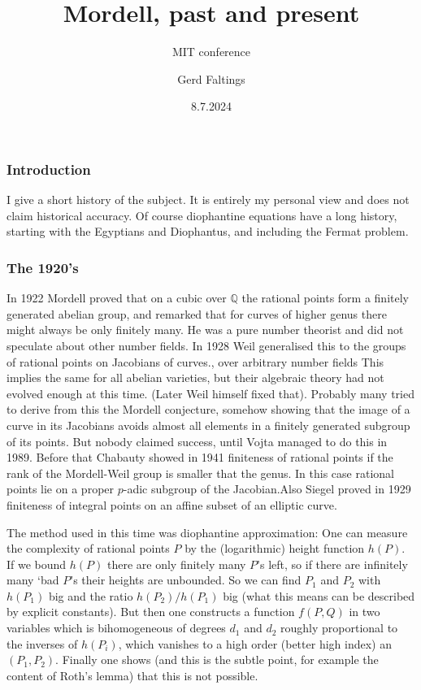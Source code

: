 \documentclass{beamer}
\title{Mordell, past and present}
\subtitle{MIT conference}
\author[G. Faltings]{Gerd Faltings}
\institute[MPIM]{Max Planck Institute for Mathematics}
\date{8.7.2024}
\begin{document}
\begin{frame}
  \titlepage
\end{frame}

\begin{frame}
\frametitle{Introduction}
I give a short history of the subject. It is entirely my personal view and does not claim historical accuracy. Of course diophantine equations have a long history,  starting with the Egyptians and Diophantus, and including the Fermat problem.
\end{frame}
\begin{frame}
\frametitle{The 1920's}
In 1922 Mordell proved that on a cubic over $\mathbb{Q}$ the rational points form a finitely generated abelian group, and remarked that for curves of higher genus there might always be only finitely many. He was a pure number theorist and did not speculate about other number fields.  In 1928 Weil generalised this to the groups of rational points on Jacobians of curves., over arbitrary number fields This implies the same for all abelian varieties, but their algebraic theory had not evolved enough at this time. (Later Weil himself fixed that). Probably many tried to derive from this the Mordell conjecture, somehow showing that the image of a curve in its Jacobians avoids almost all elements in a finitely generated subgroup of its points. But nobody claimed success, until Vojta managed to do this in 1989. Before that Chabauty showed in 1941 finiteness of rational points if the rank of the Mordell-Weil group is smaller that the genus. In this case rational points lie on a proper $p$-adic subgroup of the Jacobian.Also Siegel proved in 1929 finiteness of integral points on an affine subset of an elliptic curve. 
\end{frame}
\begin{frame}
The method used in this time was diophantine approximation: One can measure the complexity of rational points  $P$ by the (logarithmic) height function $h(P)$. If we bound $h(P)$ there are only finitely many $P$'s left, so if there are infinitely many `bad $P$'s their heights are unbounded.
So we can find $P_1$ and $P_2$ with $h(P_1)$ big and the ratio $h(P_2)/h(P_1)$ big (what this means can be described by explicit constants). But then one constructs a function $f(P,Q)$ in two variables which is bihomogeneous of degrees $d_1$ and $d_2$ roughly proportional to the inverses of $h(P_i)$, which vanishes to a high order (better high index) an $(P_1,P_2)$. Finally one shows (and this is the subtle point, for example the content of Roth's lemma) that this is not possible.
\end{frame}
\end{document}
